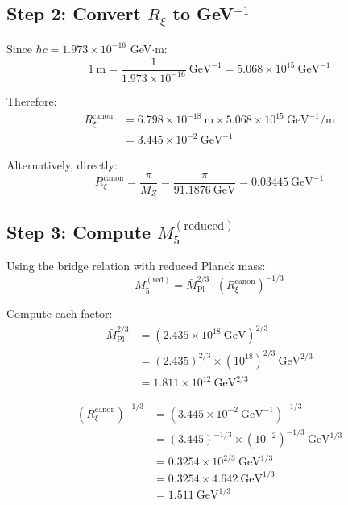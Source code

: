 \documentclass[11pt,a4paper]{article}
\newcommand{\Rxi}{R_\xi}
\newcommand{\Mplbar}{\bar{M}_{\mathrm{Pl}}}
\newcommand{\Mfive}{M_5}
\newcommand{\MZ}{M_Z}
\newcommand{\hbarc}{\hbar c}
\begin{document}
\subsection{Step 2: Convert $\Rxi$ to GeV$^{-1}$}

Since $\hbarc = 1.973 \times 10^{-16}$ GeV$\cdot$m:
\begin{equation}
1~\mathrm{m} = \frac{1}{1.973 \times 10^{-16}}~\mathrm{GeV}^{-1} = 5.068 \times 10^{15}~\mathrm{GeV}^{-1}
\label{eq:m-to-GeV}
\end{equation}

Therefore:
\begin{align}
\Rxi^{\mathrm{canon}} &= 6.798 \times 10^{-18}~\mathrm{m} \times 5.068 \times 10^{15}~\mathrm{GeV}^{-1}/\mathrm{m}
\label{eq:Rxi-GeV-step1}\\
&= 3.445 \times 10^{-2}~\mathrm{GeV}^{-1}
\label{eq:Rxi-GeV-result}
\end{align}

Alternatively, directly:
\begin{equation}
\Rxi^{\mathrm{canon}} = \frac{\pi}{\MZ} = \frac{\pi}{91.1876~\mathrm{GeV}} = 0.03445~\mathrm{GeV}^{-1}
\label{eq:Rxi-GeV-direct}
\end{equation}

\subsection{Step 3: Compute $\Mfive^{\mathrm{(reduced)}}$}

Using the bridge relation with reduced Planck mass:
\begin{equation}
\Mfive^{\mathrm{(red)}} = \Mplbar^{2/3} \cdot (\Rxi^{\mathrm{canon}})^{-1/3}
\label{eq:M5-red-formula}
\end{equation}

Compute each factor:
\begin{align}
\Mplbar^{2/3} &= (2.435 \times 10^{18}~\mathrm{GeV})^{2/3} \label{eq:Mplbar-23-step}\\
&= (2.435)^{2/3} \times (10^{18})^{2/3}~\mathrm{GeV}^{2/3} \label{eq:Mplbar-23-step2}\\
&= 1.811 \times 10^{12}~\mathrm{GeV}^{2/3} \label{eq:Mplbar-23-result}
\end{align}

\begin{align}
(\Rxi^{\mathrm{canon}})^{-1/3} &= (3.445 \times 10^{-2}~\mathrm{GeV}^{-1})^{-1/3}
\label{eq:Rxi-m13-step}\\
&= (3.445)^{-1/3} \times (10^{-2})^{-1/3}~\mathrm{GeV}^{1/3} \label{eq:Rxi-m13-step2}\\
&= 0.3254 \times 10^{2/3}~\mathrm{GeV}^{1/3} \label{eq:Rxi-m13-step3}\\
&= 0.3254 \times 4.642~\mathrm{GeV}^{1/3} \label{eq:Rxi-m13-step4}\\
&= 1.511~\mathrm{GeV}^{1/3} \label{eq:Rxi-m13-result}
\end{align}
\end{document}

